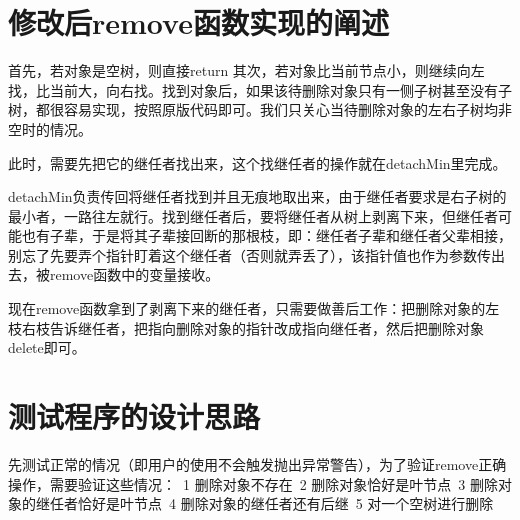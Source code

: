 \documentclass[UTF8]{ctexart}
\begin{document}
\pagestyle{fancy}
\fancyhead{}

\section{修改后remove函数实现的阐述}

首先，若对象是空树，则直接return
其次，若对象比当前节点小，则继续向左找，比当前大，向右找。找到对象后，如果该待删除对象只有一侧子树甚至没有子树，都很容易实现，按照原版代码即可。我们只关心当待删除对象的左右子树均非空时的情况。

此时，需要先把它的继任者找出来，这个找继任者的操作就在detachMin里完成。

detachMin负责传回将继任者找到并且无痕地取出来，由于继任者要求是右子树的最小者，一路往左就行。找到继任者后，要将继任者从树上剥离下来，但继任者可能也有子辈，于是将其子辈接回断的那根枝，即：继任者子辈和继任者父辈相接，别忘了先要弄个指针盯着这个继任者（否则就弄丢了），该指针值也作为参数传出去，被remove函数中的变量接收。

现在remove函数拿到了剥离下来的继任者，只需要做善后工作：把删除对象的左枝右枝告诉继任者，把指向删除对象的指针改成指向继任者，然后把删除对象delete即可。


\section{测试程序的设计思路}

先测试正常的情况（即用户的使用不会触发抛出异常警告），为了验证remove正确操作，需要验证这些情况：\
1 删除对象不存在\
2 删除对象恰好是叶节点\
3 删除对象的继任者恰好是叶节点\
4 删除对象的继任者还有后继\
5 对一个空树进行删除\
\end{document}
